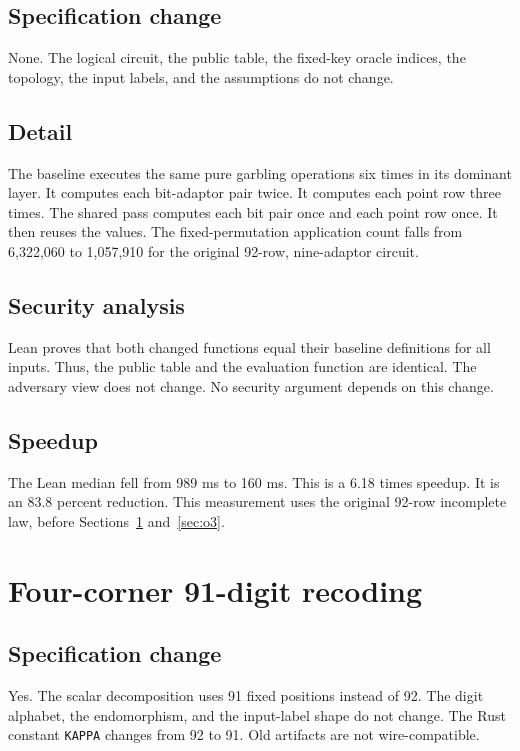 \documentclass[10pt]{article}
\begin{document}
\subsection{Specification change}
None.
The logical circuit, the public table, the fixed-key oracle indices, the topology, the input labels, and the assumptions do not change.

\subsection{Detail}
The baseline executes the same pure garbling operations six times in its dominant layer.
It computes each bit-adaptor pair twice.
It computes each point row three times.
The shared pass computes each bit pair once and each point row once.
It then reuses the values.
The fixed-permutation application count falls from 6,322,060 to 1,057,910 for the original 92-row, nine-adaptor circuit.

\subsection{Security analysis}
Lean proves that both changed functions equal their baseline definitions for all inputs.
Thus, the public table and the evaluation function are identical.
The adversary view does not change.
No security argument depends on this change.

\subsection{Speedup}
The Lean median fell from 989 ms to 160 ms.
This is a 6.18 times speedup.
It is an 83.8 percent reduction.
This measurement uses the original 92-row incomplete law, before Sections~\ref{sec:o2} and~\ref{sec:o3}.

\section{Four-corner 91-digit recoding}
\label{sec:o2}

\subsection{Specification change}
Yes.
The scalar decomposition uses 91 fixed positions instead of 92.
The digit alphabet, the endomorphism, and the input-label shape do not change.
The Rust constant \texttt{KAPPA} changes from 92 to 91.
Old artifacts are not wire-compatible.
\end{document}
